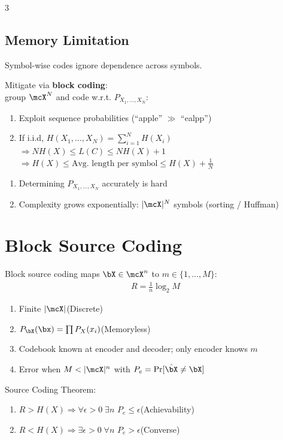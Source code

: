 \documentclass[12pt, a4paper]{article}
\begin{document}
\begin{multicols*}{3}
\subsection{Memory Limitation}
Symbol-wise codes ignore dependence across symbols.

Mitigate via \textbf{block coding}:\\group $\mcX^N$ and code w.r.t. $P_{X_1,\dots,X_N}$:
\begin{enumerate}[$+$]
  \item Exploit sequence probabilities (``apple'' $\gg$ ``ealpp'')
  \item If i.i.d, $H(X_1,\dots,X_N) = \sum^N_{i=1}H(X_i)$\\$\Rightarrow NH(X) \leq L(C) \leq NH(X) + 1$\\$\Rightarrow H(X)\leq\text{Avg. length per symbol} \leq H(X) + \frac{1}{N}$
\end{enumerate}
\begin{enumerate}[$-$]\vspace{3pt}
  \item Determining $P_{X_1,\dots,X_N}$ accurately is hard
  \item Complexity grows exponentially: $|\mcX|^N$ symbols (sorting / Huffman)
\end{enumerate}

\colbreak
\section{Block Source Coding}
Block source coding maps $\bX\in\mcX^n$ to $m\in\{1,\dots,M\}$:
\begin{align*}
  R=\tfrac{1}{n}\log_2 M 
\end{align*}
\begin{enumerate}[\roman*.]
  \item Finite $|\mcX|$\hfill(Discrete) 
  \item $P_{\bX}(\bx)=\prod P_X(x_i)$\hfill(Memoryless)
  \item Codebook known at encoder and decoder; only encoder knows $m$
  \item Error when $M<|\mcX|^n$ with $P_e=\Pr[\hat\bX\neq\bX]$
\end{enumerate}
 
Source Coding Theorem:
\begin{enumerate}[\roman*.]
  \item $R>H(X)\Rightarrow\forall \epsilon > 0\;\exists n$ $P_e \leq \epsilon$\hfill(Achievability)
  \item $R<H(X)\Rightarrow \exists \epsilon > 0 \; \forall n$ $P_e > \epsilon$\hfill(Converse)
\end{enumerate}
 

\end{multicols*}
\end{document}
